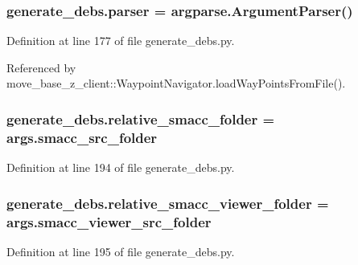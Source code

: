 \subsubsection[{\texorpdfstring{parser}{parser}}]{\setlength{\rightskip}{0pt plus 5cm}generate\+\_\+debs.\+parser = argparse.\+Argument\+Parser()}\hypertarget{namespacegenerate__debs_a4a9ae4bb85fc62d7973ea3d09ced6c26}{}\label{namespacegenerate__debs_a4a9ae4bb85fc62d7973ea3d09ced6c26}


Definition at line 177 of file generate\+\_\+debs.\+py.



Referenced by move\+\_\+base\+\_\+z\+\_\+client\+::\+Waypoint\+Navigator.\+load\+Way\+Points\+From\+File().

\subsubsection[{\texorpdfstring{relative\+\_\+smacc\+\_\+folder}{relative_smacc_folder}}]{\setlength{\rightskip}{0pt plus 5cm}generate\+\_\+debs.\+relative\+\_\+smacc\+\_\+folder = args.\+smacc\+\_\+src\+\_\+folder}\hypertarget{namespacegenerate__debs_abf6925bd06ac1da3981fe638eefb5a61}{}\label{namespacegenerate__debs_abf6925bd06ac1da3981fe638eefb5a61}


Definition at line 194 of file generate\+\_\+debs.\+py.

\subsubsection[{\texorpdfstring{relative\+\_\+smacc\+\_\+viewer\+\_\+folder}{relative_smacc_viewer_folder}}]{\setlength{\rightskip}{0pt plus 5cm}generate\+\_\+debs.\+relative\+\_\+smacc\+\_\+viewer\+\_\+folder = args.\+smacc\+\_\+viewer\+\_\+src\+\_\+folder}\hypertarget{namespacegenerate__debs_a22d892b78adfce583710d78737eb4747}{}\label{namespacegenerate__debs_a22d892b78adfce583710d78737eb4747}


Definition at line 195 of file generate\+\_\+debs.\+py.

